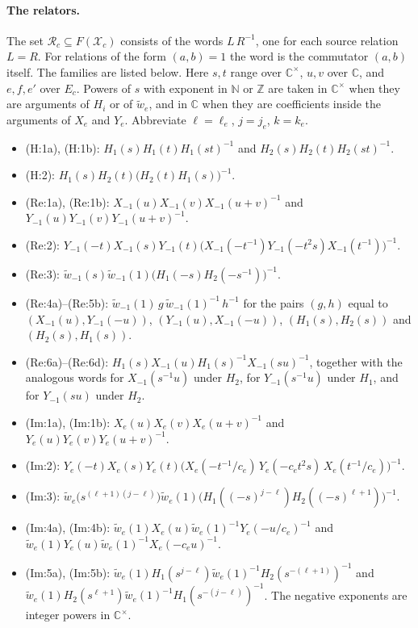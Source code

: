 \documentclass[11pt]{article}
\theoremstyle{definition}
\theoremstyle{remark}
\newcommand{\Cx}{\mathbb{C}^\times}
\newcommand{\wt}{\widetilde{w}}
\newcommand{\cX}{\mathcal{X}}
\newcommand{\cR}{\mathcal{R}}
\begin{document}
\paragraph{The relators.} The set $\cR_c\subseteq F(\cX_c)$ consists of the words $L\,R^{-1}$, one for each source relation $L=R$. For relations of the form $(a,b)=1$ the word is the commutator $(a,b)$ itself. The families are listed below. Here $s,t$ range over $\Cx$, $u,v$ over $\mathbb{C}$, and $e,f,e'$ over $E_c$. Powers of $s$ with exponent in $\mathbb{N}$ or $\mathbb{Z}$ are taken in $\Cx$ when they are arguments of $H_i$ or of $\wt_e$, and in $\mathbb{C}$ when they are coefficients inside the arguments of $X_e$ and $Y_e$. Abbreviate $\ell=\ell_e$, $j=j_e$, $k=k_e$.
\begin{itemize}
\item (H:1a), (H:1b): $H_1(s)H_1(t)H_1(st)^{-1}$ and $H_2(s)H_2(t)H_2(st)^{-1}$.
\item (H:2): $H_1(s)H_2(t)\bigl(H_2(t)H_1(s)\bigr)^{-1}$.
\item (Re:1a), (Re:1b): $X_{-1}(u)X_{-1}(v)X_{-1}(u+v)^{-1}$ and $Y_{-1}(u)Y_{-1}(v)Y_{-1}(u+v)^{-1}$.
\item (Re:2): $Y_{-1}(-t)X_{-1}(s)Y_{-1}(t)\bigl(X_{-1}(-t^{-1})Y_{-1}(-t^2s)X_{-1}(t^{-1})\bigr)^{-1}$.
\item (Re:3): $\wt_{-1}(s)\wt_{-1}(1)\bigl(H_1(-s)H_2(-s^{-1})\bigr)^{-1}$.
\item (Re:4a)--(Re:5b): $\wt_{-1}(1)\,g\,\wt_{-1}(1)^{-1}\,h^{-1}$ for the pairs $(g,h)$ equal to $(X_{-1}(u),Y_{-1}(-u))$, $(Y_{-1}(u),X_{-1}(-u))$, $(H_1(s),H_2(s))$ and $(H_2(s),H_1(s))$.
\item (Re:6a)--(Re:6d): $H_1(s)X_{-1}(u)H_1(s)^{-1}X_{-1}(su)^{-1}$, together with the analogous words for $X_{-1}(s^{-1}u)$ under $H_2$, for $Y_{-1}(s^{-1}u)$ under $H_1$, and for $Y_{-1}(su)$ under $H_2$.
\item (Im:1a), (Im:1b): $X_e(u)X_e(v)X_e(u+v)^{-1}$ and $Y_e(u)Y_e(v)Y_e(u+v)^{-1}$.
\item (Im:2): $Y_e(-t)X_e(s)Y_e(t)\bigl(X_e(-t^{-1}/c_e)\,Y_e(-c_et^2s)\,X_e(t^{-1}/c_e)\bigr)^{-1}$.
\item (Im:3): $\wt_e\bigl(s^{(\ell+1)(j-\ell)}\bigr)\wt_e(1)\bigl(H_1((-s)^{j-\ell})H_2((-s)^{\ell+1})\bigr)^{-1}$.
\item (Im:4a), (Im:4b): $\wt_e(1)X_e(u)\wt_e(1)^{-1}Y_e(-u/c_e)^{-1}$ and $\wt_e(1)Y_e(u)\wt_e(1)^{-1}X_e(-c_eu)^{-1}$.
\item (Im:5a), (Im:5b): $\wt_e(1)H_1(s^{j-\ell})\wt_e(1)^{-1}H_2(s^{-(\ell+1)})^{-1}$ and $\wt_e(1)H_2(s^{\ell+1})\wt_e(1)^{-1}H_1(s^{-(j-\ell)})^{-1}$. The negative exponents are integer powers in $\Cx$.

\end{itemize}
\end{document}

